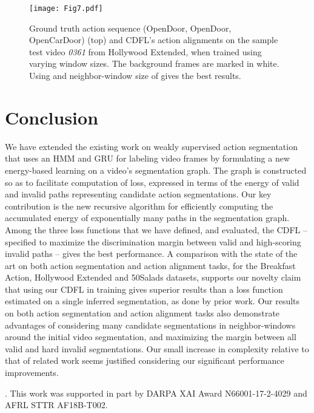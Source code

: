 \documentclass[10pt,twocolumn,letterpaper]{article}
\begin{document}
\begin{figure}
\centering
\texttt{[image: Fig7.pdf]}
\caption{Ground truth action sequence (\textcolor{myturquoise}{OpenDoor}, \textcolor{myturquoise}{OpenDoor}, \textcolor{mymagenta}{OpenCarDoor}) (top) and CDFL's action alignments on the sample test video \textit{0361} from Hollywood Extended, when trained using varying window sizes. The background frames are marked in white. Using \abbrmodel{} and neighbor-window size of  gives the best results. }
\label{fig:diff_win_align}
\vspace{-2mm}
\end{figure}


\section{Conclusion}\label{sec:Conclusion}
We have extended the existing work on weakly supervised action segmentation that uses an HMM and GRU for labeling video frames by formulating a new energy-based learning on a video's segmentation graph. The graph is constructed so as to facilitate computation of loss, expressed in terms of the energy of valid and invalid paths representing candidate action segmentations. Our key contribution is the new recursive algorithm for efficiently computing the accumulated energy of exponentially many paths in the segmentation graph. Among the three loss functions that we have defined, 
and evaluated,
the CDFL -- specified to maximize the discrimination margin between valid and high-scoring invalid paths -- gives the best performance. A comparison with the state of the art on both action segmentation and action alignment tasks, for the Breakfast Action, Hollywood Extended and 50Salads datasets, supports our novelty claim that using our CDFL in training gives superior results than a loss function estimated on a single inferred segmentation, as done by prior work. Our results on both action segmentation and action alignment tasks also demonstrate advantages of considering many candidate segmentations in neighbor-windows around the initial video segmentation, and maximizing the margin between all valid and hard invalid segmentations. Our small increase in complexity relative to that of related work seems justified considering our significant performance improvements.

. This work was supported in part by DARPA XAI Award N66001-17-2-4029 and AFRL STTR AF18B-T002.










{\small


}
\end{document}
